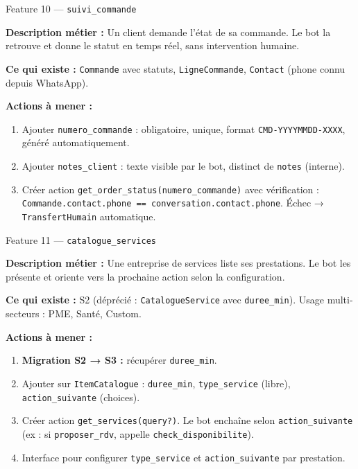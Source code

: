 \documentclass[11pt,a4paper]{article}
\newcommand{\slug}[1]{\texttt{\color{AGTDark}#1}}
\newcommand{\priom}[1]{\textcolor{AGTOrange}{\textbf{#1}}}
\begin{document}
\begin{featurebox}{Feature 10 — \slug{suivi\_commande}}

\textbf{Description métier :} Un client demande l'état de sa commande. Le bot
la retrouve et donne le statut en temps réel, sans intervention humaine.

\textbf{Ce qui existe :} \slug{Commande} avec statuts, \slug{LigneCommande},
\slug{Contact} (phone connu depuis WhatsApp).

\medskip
\textbf{Actions à mener :}
\begin{enumerate}
  \item Ajouter \slug{numero\_commande} : obligatoire, unique, format
        \texttt{CMD-YYYYMMDD-XXXX}, généré automatiquement.
  \item Ajouter \slug{notes\_client} : texte visible par le bot, distinct
        de \slug{notes} (interne).
  \item Créer action \slug{get\_order\_status(numero\_commande)} avec
        vérification : \texttt{Commande.contact.phone == conversation.contact.phone}.
        Échec → \slug{TransfertHumain} automatique.
\end{enumerate}

\end{featurebox}

\bigskip

\begin{featurebox}{Feature 11 — \slug{catalogue\_services}}

\textbf{Description métier :} Une entreprise de services liste ses prestations.
Le bot les présente et oriente vers la prochaine action selon la configuration.

\textbf{Ce qui existe :} S2 (déprécié : \slug{CatalogueService} avec
\slug{duree\_min}). Usage multi-secteurs : PME, Santé, Custom.

\medskip
\textbf{Actions à mener :}
\begin{enumerate}
  \item \priom{Migration S2 → S3 :} récupérer \slug{duree\_min}.
  \item Ajouter sur \slug{ItemCatalogue} : \slug{duree\_min},
        \slug{type\_service} (libre), \slug{action\_suivante} (choices).
  \item Créer action \slug{get\_services(query?)}. Le bot enchaîne selon
        \slug{action\_suivante} (ex : si \texttt{proposer\_rdv}, appelle
        \slug{check\_disponibilite}).
  \item Interface pour configurer \slug{type\_service} et \slug{action\_suivante}
        par prestation.
\end{enumerate}

\end{featurebox}
\end{document}

